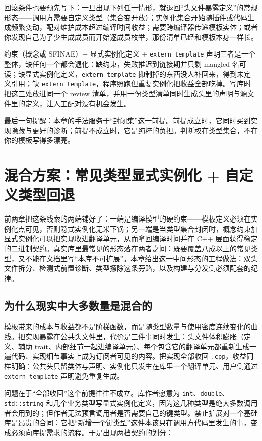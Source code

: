\documentclass[12pt,a4paper,fontset=fandol]{ctexbook}
\newcommand{\cpp}[1]{C++#1}
\newcommand{\kw}[1]{\texttt{#1}}
\begin{document}
回滚条件也要预先写下：一旦出现下列任一情形，就退回“头文件暴露定义”的常规形态——调用方需要自定义类型（集合变开放）；实例化集合开始随插件或代码生成频繁变动，配对维护成本超过编译时间收益；需要跨编译器传递模板实体；或者你发现自己为了少生成成员而开始逐成员枚举，那份清单已经和模板本身一样长。

\begin{bestpractice}[title={三件套必须同时出现}]
约束（概念或 SFINAE）+ 显式实例化定义 + \kw{extern template} 声明三者是一个整体，缺任何一个都会退化：缺约束，失败推迟到链接期并只剩 mangled 名可读；缺显式实例化定义，\kw{extern template} 抑制掉的东西没人补回来，得到未定义引用；缺 \kw{extern template}，程序照跑但重复实例化把收益全部吃掉。写库时把这三处放进同一个 review 清单，并用一份类型清单同时生成头里的声明与源文件里的定义，让人工配对没有机会发生。
\end{bestpractice}

最后一句提醒：本章的手法服务于“封闭集”这一前提。前提成立时，它同时买到实现隐藏与更好的诊断；前提不成立时，它是纯粹的负担。判断权在类型集合，不在你的模板写得多漂亮。

\chapter{混合方案：常见类型显式实例化 + 自定义类型回退}

前两章把这条线索的两端铺好了：一端是编译模型的硬约束——模板定义必须在实例化点可见，否则隐式实例化无米下锅；另一端是当类型集合封闭时，概念约束加显式实例化可以把实现收进翻译单元，从而拿回编译时间并在 \cpp{} 层面获得稳定的二进制契约。真实库里最常见的形态落在两者之间：既要覆盖八成以上的常见类型，又不能在文档里写“本库不可扩展”。本章给出这一中间形态的工程做法：双头文件拆分、检测式前置诊断、类型擦除这条旁路，以及构建与分发侧必须配套的纪律。

\section{为什么现实中大多数量是混合的}

模板带来的成本与收益都不是阶梯函数，而是随类型数量与使用密度连续变化的曲线。把实现暴露在公共头文件里，代价是三件事同时发生：头文件体积膨胀（定义、辅助 trait、内部细节一起进编译单元）、每个包含它的翻译单元都重新生成一遍代码、实现细节事实上成为订阅者可见的内容。把实现全部收回 \kw{.cpp}，收益同样明确：公共头只留类体与声明、实例化只发生在库里一个翻译单元、用户侧通过 \kw{extern template} 声明避免重复生成。

问题在于“全部收回”这个前提往往不成立。库作者愿意为 \kw{int}、\kw{double}、\kw{std::string} 和几个业务类型写显式实例化定义，因为这几种类型是绝大多数调用者会用到的；但作者无法预言调用者是否需要自己的键类型。禁止扩展对一个基础库是昂贵的合同：它把“新增一个键类型”这件本该只在调用方代码里发生的事，变成必须向库提需求的流程。于是出现两档契约的划分：
\end{document}
